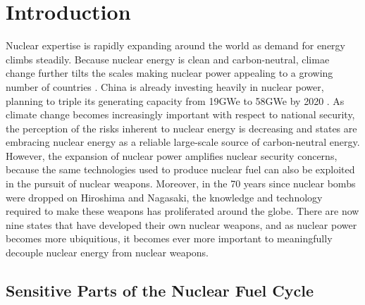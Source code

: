 \section{Introduction}
\label{s_motive}

Nuclear expertise is rapidly expanding around the world as demand for energy climbs steadily. Because nuclear energy is clean and carbon-neutral, climae change further tilts the scales making nuclear power appealing to a growing number of countries \cite{mooney_why_2014}.  China is already investing heavily in nuclear power, planning to triple its generating capacity from 19GWe to 58GWe by 2020  \cite{_china_2014}.  As climate change becomes increasingly important with respect to national security, the perception of the risks inherent to nuclear energy is decreasing and states are embracing nuclear energy as a reliable large-scale source of carbon-neutral energy.  However, the expansion of nuclear power amplifies nuclear security concerns, because the same technologies used to produce nuclear fuel can also be exploited in the pursuit of nuclear weapons.  Moreover, in the 70 years since nuclear bombs were dropped on Hiroshima and Nagasaki, the knowledge and technology required to make these weapons has proliferated around the globe\cite{feiveson_unmaking_2014}. There are now nine states that have developed their own nuclear weapons, and as nuclear power becomes more ubiquitious, it becomes ever more important to meaningfully decouple nuclear energy from nuclear weapons.  


\subsection{Sensitive Parts of the Nuclear Fuel Cycle}

